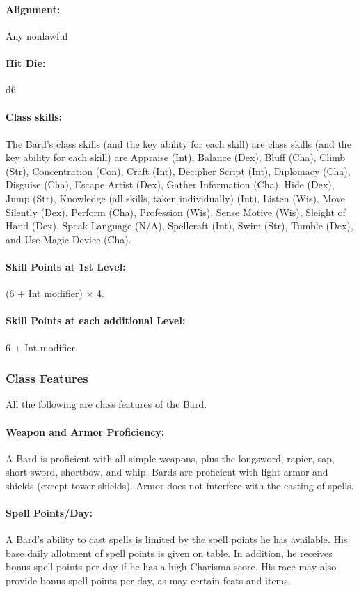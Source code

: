 \paragraph{Alignment:} Any nonlawful
\paragraph{Hit Die:} d6
\paragraph{Class skills:}
The Bard's class skills (and the key ability for each skill) are 
class skills (and the key ability for each skill) are Appraise (Int), Balance (Dex), Bluff (Cha), Climb (Str), Concentration (Con), Craft (Int), Decipher Script (Int), Diplomacy (Cha), Disguise (Cha), Escape Artist (Dex), Gather Information (Cha), Hide (Dex), Jump (Str), Knowledge (all skills, taken individually) (Int), Listen (Wis), Move Silently (Dex), Perform (Cha), Profession (Wis), Sense Motive (Wis), Sleight of Hand (Dex), Speak Language (N/A), Spellcraft (Int), Swim (Str), Tumble (Dex), and Use Magic Device (Cha).
\paragraph{Skill Points at 1st Level:} (6 + Int modifier) $\times$ 4.
\paragraph{Skill Points at each additional Level:} 6 + Int modifier.

\subsubsection{Class Features}
All the following are class features of the Bard.

\paragraph{Weapon and Armor Proficiency:} 
A Bard is proficient with all simple weapons, plus the longsword, rapier, sap, short sword, shortbow, and whip. 
Bards are proficient with light armor and shields (except tower shields).
Armor does not interfere with the casting of spells.

\paragraph{Spell Points/Day:} 
A Bard's ability to cast spells is limited by the spell points he has available. 
His base daily allotment of spell points is given on  table. 
In addition, he receives bonus spell points per day if he has a high Charisma score.
His race may also provide bonus spell points per day, as may certain feats and items.

